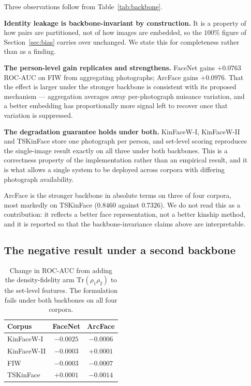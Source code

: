 \documentclass[preprint,12pt]{elsarticle}
\begin{document}
Three observations follow from Table~\ref{tab:backbone}.

\textbf{Identity leakage is backbone-invariant by construction.} It is a
property of how pairs are partitioned, not of how images are embedded, so the
$100\%$ figure of Section~\ref{sec:bias} carries over unchanged. We state this
for completeness rather than as a finding.

\textbf{The person-level gain replicates and strengthens.} FaceNet gains
$+0.0763$ ROC-AUC on FIW from aggregating photographs; ArcFace gains
$+0.0976$. That the effect is larger under the stronger backbone is consistent
with its proposed mechanism --- aggregation averages away per-photograph
nuisance variation, and a better embedding has proportionally more signal left
to recover once that variation is suppressed.

\textbf{The degradation guarantee holds under both.} KinFaceW-I, KinFaceW-II
and TSKinFace store one photograph per person, and set-level scoring reproduces
the single-image result exactly on all three under both backbones. This is a
correctness property of the implementation rather than an empirical result, and
it is what allows a single system to be deployed across corpora with differing
photograph availability.

ArcFace is the stronger backbone in absolute terms on three of four corpora,
most markedly on TSKinFace ($0.8460$ against $0.7326$). We do not read this as
a contribution: it reflects a better face representation, not a better kinship
method, and it is reported so that the backbone-invariance claims above are
interpretable.

\subsection{The negative result under a second backbone}

\begin{table}[t]
\centering
\caption{Change in ROC-AUC from adding the density-fidelity arm
$\mathrm{Tr}(\rho_1\rho_2)$ to the set-level features. The formulation fails
under both backbones on all four corpora.}
\label{tab:backbone_quantum}
\begin{tabular}{lcc}
\toprule
Corpus & FaceNet & ArcFace \\
\midrule
KinFaceW-I & $-0.0025$ & $-0.0006$ \\
KinFaceW-II & $-0.0003$ & $+0.0001$ \\
FIW & $-0.0003$ & $-0.0007$ \\
TSKinFace & $+0.0001$ & $-0.0014$ \\
\bottomrule
\end{tabular}
\end{table}
\end{document}
